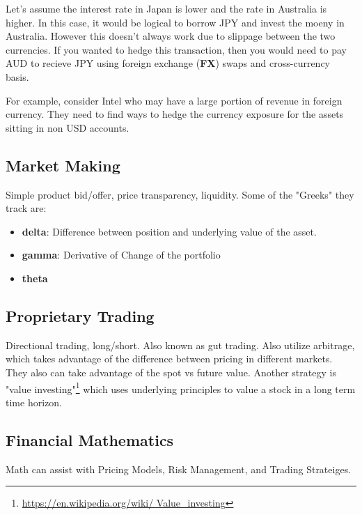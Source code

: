 Let's assume the interest rate in Japan is lower and the rate in Australia is
higher. In this case, it would be logical to borrow JPY and invest the
moeny in Australia. However this doesn't always work due to slippage between the
two currencies. If you wanted to hedge this transaction, then you would need to
pay AUD to recieve JPY using foreign exchange (\textbf{FX}) swaps and
cross-currency basis.

For example, consider Intel who may have a large portion of revenue in foreign
currency. They need to find ways to hedge the currency exposure for the assets
sitting in non USD accounts.

\subsection{Market Making}

Simple product bid/offer, price transparency, liquidity. Some of the "Greeks"
they track are:

\begin{itemize}
  \item \textbf{delta}:  Difference between position and underlying value of the
    asset.
  \item \textbf{gamma}: Derivative of Change of the portfolio 
  \item \textbf{theta}
\end{itemize}

\subsection{Proprietary Trading}

Directional trading, long/short. Also known as gut trading. Also utilize
arbitrage, which takes advantage of the difference between pricing in different
markets. They also can take advantage of the spot vs future value. Another
strategy is "value investing"\footnote{\url{https://en.wikipedia.org/wiki/
Value_investing}} which uses underlying principles to value a stock in a long
term time horizon.

\subsection{Financial Mathematics}

Math can assist with Pricing Models, Risk Management, and Trading Strateiges.

